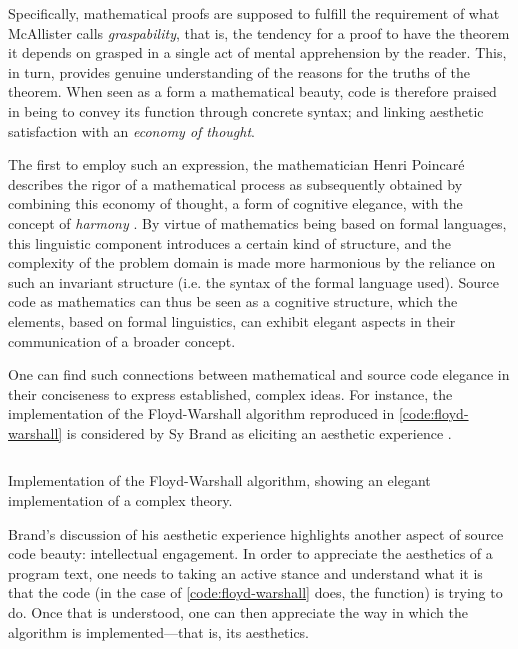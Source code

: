 Specifically, mathematical proofs are supposed to fulfill the requirement of what McAllister calls \emph{graspability}, that is, the tendency for a proof to have the theorem it depends on grasped in a single act of mental apprehension by the reader. This, in turn, provides genuine understanding of the reasons for the truths of the theorem. When seen as a form a mathematical beauty, code is therefore praised in being to convey its function through concrete syntax; and linking aesthetic satisfaction with an \emph{economy of thought}.

The first to employ such an expression, the mathematician Henri Poincaré describes the rigor of a mathematical process as subsequently obtained by combining this economy of thought, a form of cognitive elegance, with the concept of \emph{harmony} \citep{poincare_science_1908}. By virtue of mathematics being based on formal languages, this linguistic component introduces a certain kind of structure, and the complexity of the problem domain is made more harmonious by the reliance on such an invariant structure (i.e. the syntax of the formal language used). Source code as mathematics can thus be seen as a cognitive structure, which the elements, based on formal linguistics, can exhibit elegant aspects in their communication of a broader concept.

One can find such connections between mathematical and source code elegance in their conciseness to express established, complex ideas. For instance, the implementation of the Floyd-Warshall algorithm reproduced in \autoref{code:floyd-warshall} is considered by Sy Brand as eliciting an aesthetic experience \citep{cpppconference_keynote_2022}.

\begin{listing}
  \inputminted{perl}{./corpus/floyd_warshall.cpp}
  \caption{Implementation of the Floyd-Warshall algorithm, showing an elegant implementation of a complex theory.}
  \label{code:floyd-warshall}
\end{listing}

Brand's discussion of his aesthetic experience highlights another aspect of source code beauty: intellectual engagement. In order to appreciate the aesthetics of a program text, one needs to taking an active stance and understand what it is that the code (in the case of \autoref{code:floyd-warshall} does, the function) is trying to do. Once that is understood, one can then appreciate the way in which the algorithm is implemented—that is, its aesthetics.

